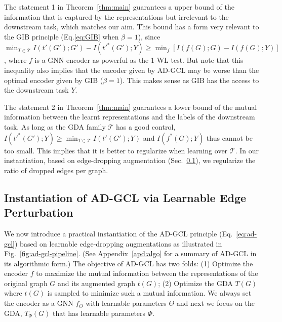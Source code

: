 The statement 1 in Theorem~\ref{thm:main} guarantees a upper bound of the information that is captured by the representations but irrelevant to the downstream task, which matches our aim. This bound has a form very relevant to the GIB principle (Eq.\ref{eq:GIB} when $\beta=1$), since $ \min_{T\in\mathcal{T}} I(t'(G'); G') - I(t'^*(G'); Y) \geq \min_{f} [I(f(G); G) - I(f(G); Y)]$,
where $f$ is a GNN encoder as powerful as the 1-WL test. But note that this inequality also implies that the encoder given by AD-GCL may be worse than the optimal encoder given by GIB ($\beta =1$). This makes sense as GIB has the access to the downstream task $Y$.

The statement 2 in Theorem~\ref{thm:main} guarantees a lower bound of the mutual information between the learnt representations and the labels of the downstream task. As long as the GDA family $\mathcal{T}$ has a good control, $I(t'^*(G'); Y)\geq \min_{T\in\mathcal{T}}I(t'(G');Y)$ and $I(f^*(G); Y)$ thus cannot be too small. This implies that it is better to regularize when learning over $\mathcal{T}$. In our instantiation, based on edge-dropping augmentation (Sec.~\ref{sec:instantiation}), we regularize the ratio of dropped edges per graph. 

\vspace{-1mm}
\subsection{Instantiation of AD-GCL via Learnable Edge Perturbation} \label{sec:instantiation}
\vspace{-1mm}
We now introduce a practical instantiation of the AD-GCL principle (Eq.~\ref{eq:ad-gcl}) based on learnable edge-dropping augmentations as illustrated in Fig.~\ref{fig:ad-gcl-pipeline}. 
(See Appendix~\ref{apd:algo} for a summary of AD-GCL in its algorithmic form.)
The objective of AD-GCL has two folds: (1) Optimize the encoder $f$ to maximize the mutual information between the representations of the original graph $G$ and its augmented graph $t(G)$; (2) Optimize the GDA $T(G)$ where $t(G)$ is sampled to minimize such a mutual information. We always set the encoder as a GNN $f_{\Theta}$ with learnable parameters $\Theta$ and next we focus on the GDA, $T_{\Phi}(G)$ that has learnable parameters $\Phi$. \vspace{-1mm}

